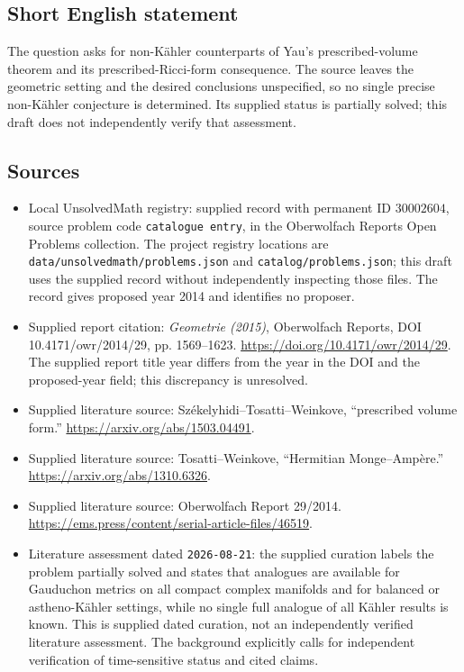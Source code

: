 \documentclass[11pt]{article}
\begin{document}
\subsection{Short English statement}
The question asks for non-K\"ahler counterparts of Yau's prescribed-volume theorem and its prescribed-Ricci-form consequence. The source leaves the geometric setting and the desired conclusions unspecified, so no single precise non-K\"ahler conjecture is determined. Its supplied status is partially solved; this draft does not independently verify that assessment.
\subsection{Sources}
\begin{itemize}
\item Local UnsolvedMath registry: supplied record with permanent ID \(30002604\), source problem code \texttt{catalogue entry}, in the Oberwolfach Reports Open Problems collection. The project registry locations are \texttt{data/unsolvedmath/problems.json} and \texttt{catalog/problems.json}; this draft uses the supplied record without independently inspecting those files. The record gives proposed year 2014 and identifies no proposer.
\item Supplied report citation: \emph{Geometrie (2015)}, Oberwolfach Reports, DOI 10.4171/owr/2014/29, pp. 1569--1623. \url{https://doi.org/10.4171/owr/2014/29}. The supplied report title year differs from the year in the DOI and the proposed-year field; this discrepancy is unresolved.
\item Supplied literature source: Sz\'ekelyhidi--Tosatti--Weinkove, ``prescribed volume form.'' \url{https://arxiv.org/abs/1503.04491}.
\item Supplied literature source: Tosatti--Weinkove, ``Hermitian Monge--Amp\`ere.'' \url{https://arxiv.org/abs/1310.6326}.
\item Supplied literature source: Oberwolfach Report 29/2014. \url{https://ems.press/content/serial-article-files/46519}.
\item Literature assessment dated \texttt{2026-08-21}: the supplied curation labels the problem partially solved and states that analogues are available for Gauduchon metrics on all compact complex manifolds and for balanced or astheno-K\"ahler settings, while no single full analogue of all K\"ahler results is known. This is supplied dated curation, not an independently verified literature assessment. The background explicitly calls for independent verification of time-sensitive status and cited claims.
\end{itemize}
\end{document}
